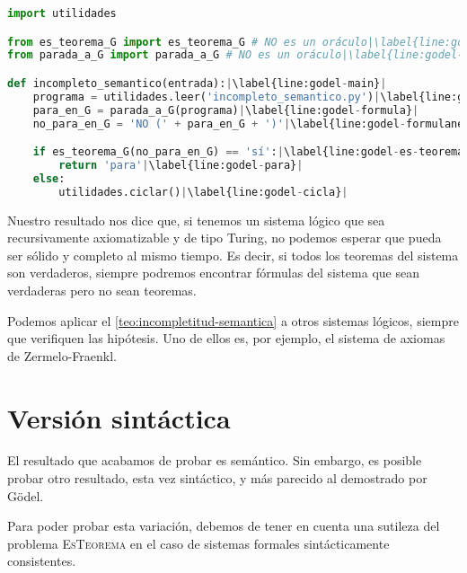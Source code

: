 \vspace{8pt}
\begin{lstlisting}[language=Python, caption=\lstinline{godel.py},label={lst:godel}]
import utilidades

from es_teorema_G import es_teorema_G # NO es un oráculo|\label{line:godel-import1}|
from parada_a_G import parada_a_G # NO es un oráculo|\label{line:godel-import2}|

def incompleto_semantico(entrada):|\label{line:godel-main}|
    programa = utilidades.leer('incompleto_semantico.py')|\label{line:godel-programa}|
    para_en_G = parada_a_G(programa)|\label{line:godel-formula}|
    no_para_en_G = 'NO (' + para_en_G + ')'|\label{line:godel-formulaneg}|

    if es_teorema_G(no_para_en_G) == 'sí':|\label{line:godel-es-teorema}|
        return 'para'|\label{line:godel-para}|
    else:
        utilidades.ciclar()|\label{line:godel-cicla}|
\end{lstlisting}

Nuestro resultado nos dice que, si tenemos un sistema lógico que sea recursivamente axiomatizable y de tipo Turing, no podemos esperar que pueda ser sólido y completo al mismo tiempo. Es decir, si todos los teoremas del sistema son verdaderos, siempre podremos encontrar fórmulas del sistema que sean verdaderas pero no sean teoremas.

Podemos aplicar el \cref{teo:incompletitud-semantica} a otros sistemas lógicos, siempre que verifiquen las hipótesis. Uno de ellos es, por ejemplo, el sistema de axiomas de Zermelo-Fraenkl.

\section{Versión sintáctica}\label{sec:version-sintactica}

El resultado que acabamos de probar es semántico. Sin embargo, es posible probar otro resultado, esta vez sintáctico, y más parecido al demostrado por Gödel.

Para poder probar esta variación, debemos de tener en cuenta una sutileza del problema \textsc{EsTeorema} en el caso de sistemas formales sintácticamente consistentes.

